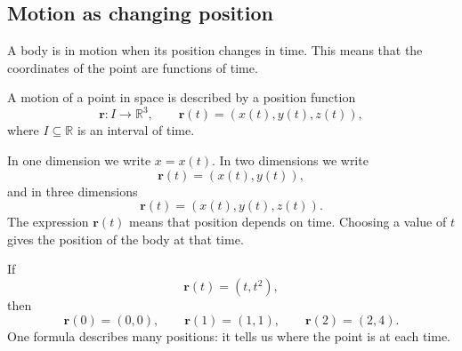 \subsection{Motion as changing position}

A body is in motion when its position changes in time. This means that the coordinates of the point are functions of time.

\begin{definitionbox}
A motion of a point in space is described by a position function
\[
\mathbf{r}\colon I\to\mathbb{R}^3,
\qquad
\mathbf{r}(t)=(x(t),y(t),z(t)),
\]
where \(I\subseteq\mathbb{R}\) is an interval of time.
\end{definitionbox}

In one dimension we write \(x=x(t)\). In two dimensions we write
\[
\mathbf{r}(t)=(x(t),y(t)),
\]
and in three dimensions
\[
\mathbf{r}(t)=(x(t),y(t),z(t)).
\]
The expression \(\mathbf{r}(t)\) means that position depends on time. Choosing a value of \(t\) gives the position of the body at that time.

\begin{examplebox}
If
\[
\mathbf{r}(t)=(t,t^2),
\]
then
\[
\mathbf{r}(0)=(0,0),\qquad
\mathbf{r}(1)=(1,1),\qquad
\mathbf{r}(2)=(2,4).
\]
One formula describes many positions: it tells us where the point is at each time.
\end{examplebox}

\begin{center}
\end{center}

